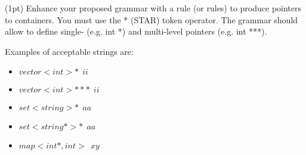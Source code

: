 (1pt) Enhance your proposed grammar with a rule (or rules) to produce pointers to containers. You must use the * (STAR) token operator. The grammar should
allow to define single- (e.g. int *) and multi-level pointers (e.g. int ***).

Examples of acceptable strings are:

\begin{itemize}
\item $vector<int> * ~~ii$
\item $vector<int> *** ~~ii$
\item $set<string> *~~ aa$
\item $set<string*> *~~ aa$
\item $map<int*,int>~~xy$
\end{itemize}

\vspace{2in}
